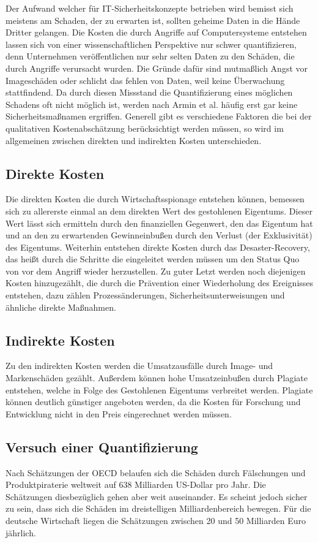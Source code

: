 \documentclass[
book,
a4paper,   
titlepage,  
halfparskip,
12pt        
]{scrartcl}
\begin{document}
\begin{onehalfspacing}
Der Aufwand welcher für \ac{IT}-Sicherheitskonzepte betrieben wird bemisst sich meistens am Schaden, der zu erwarten ist, sollten geheime Daten in die Hände Dritter gelangen. Die Kosten die durch Angriffe auf Computersysteme entstehen lassen sich von einer wissenschaftlichen Perspektive nur schwer quantifizieren, denn Unternehmen veröffentlichen nur sehr selten Daten zu den Schäden, die durch Angriffe verursacht wurden. Die Gründe dafür sind mutmaßlich Angst vor Imageschäden oder schlicht das fehlen von Daten, weil keine Überwachung stattfindend. Da durch diesen Missstand die Quantifizierung eines möglichen Schadens oft nicht möglich ist, werden nach Armin et al. \cite{spionage} häufig erst gar keine Sicherheitsmaßnamen ergriffen. Generell gibt es verschiedene Faktoren die bei der qualitativen Kostenabschätzung berücksichtigt werden müssen, so wird im allgemeinen zwischen direkten und indirekten Kosten unterschieden.\cite[S. 12]{kosten}
\subsection{Direkte Kosten}
Die direkten Kosten die durch Wirtschaftsspionage entstehen können, bemessen sich zu allererste einmal an dem direkten Wert des gestohlenen Eigentums. Dieser Wert lässt sich ermitteln durch den finanziellen Gegenwert, den das Eigentum hat und an den zu erwartenden Gewinneinbußen durch den Verlust (der Exklusivität) des Eigentums. Weiterhin entstehen direkte Kosten durch das Desaster-Recovery, das heißt durch die Schritte die eingeleitet werden müssen um den Status Quo von vor dem Angriff wieder herzustellen. Zu guter Letzt werden noch diejenigen Kosten hinzugezählt, die durch die Prävention einer Wiederholung des Ereignisses entstehen, dazu zählen Prozessänderungen, Sicherheitsunterweisungen und ähnliche direkte Maßnahmen.\cite[S. 13]{kosten}
\subsection{Indirekte Kosten}
Zu den indirekten Kosten werden die Umsatzausfälle durch Image- und Markenschäden gezählt. Außerdem können hohe Umsatzeinbußen durch Plagiate entstehen, welche in Folge des Gestohlenen Eigentums verbreitet werden. Plagiate können deutlich günstiger angeboten werden, da die Kosten für Forschung und Entwicklung nicht in den Preis eingerechnet werden müssen.\cite[S. 14]{kosten}
\subsection{Versuch einer Quantifizierung}
Nach Schätzungen der \ac{OECD} belaufen sich die Schäden durch Fälschungen und Produktpiraterie weltweit auf 638 Milliarden US-Dollar pro Jahr. Die Schätzungen diesbezüglich gehen aber weit auseinander. Es scheint jedoch sicher zu sein, dass sich die Schäden im dreistelligen Milliardenbereich bewegen. Für die deutsche Wirtschaft liegen die Schätzungen zwischen 20 und 50 Milliarden Euro jährlich.\cite[S. 16f]{kosten}

\end{onehalfspacing}
\end{document}
